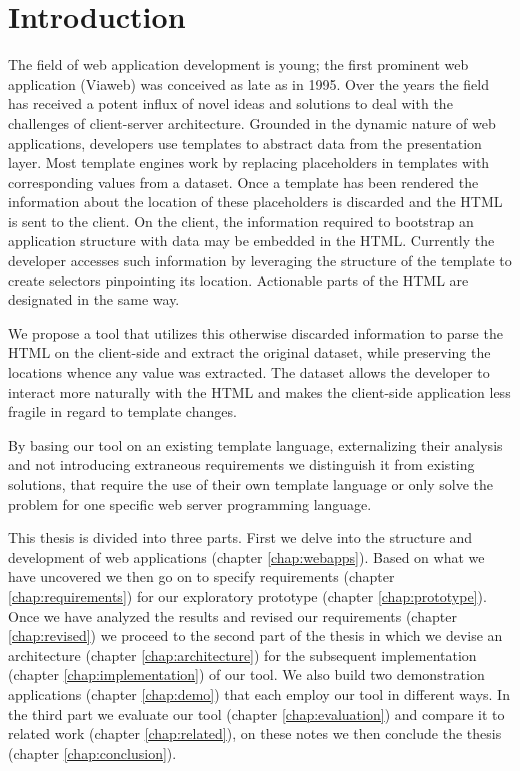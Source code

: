\documentclass[thesis.tex]{subfiles}
\begin{document}
\chapter{Introduction}
\label{chap:intro}
The field of web application development is young; the first prominent
web application (Viaweb) was conceived as late as in 1995.
Over the years the field has received a potent influx of novel ideas and
solutions to deal with the challenges of client-server architecture.
Grounded in the dynamic nature of web applications, developers use templates to
abstract data from the presentation layer.
Most template engines work by replacing placeholders in templates with
corresponding values from a dataset.
Once a template has been rendered the information about the location of these
placeholders is discarded and the HTML is sent to the client.
On the client, the information required to bootstrap an application structure
with data may be embedded in the HTML. Currently the developer accesses such
information by leveraging the structure of the template to create selectors
pinpointing its location. Actionable parts of the HTML are designated in the
same way.

We propose a tool that utilizes this otherwise discarded information to parse
the HTML on the client-side and extract the original dataset, while preserving
the locations whence any value was extracted. The dataset allows the developer
to interact more naturally with the HTML and makes the client-side application
less fragile in regard to template changes.

By basing our tool on an existing template language, externalizing their
analysis and not introducing extraneous requirements we distinguish it from
existing solutions,
that require the use of their own template language or only solve the problem
for one specific web server programming language.


This thesis is divided into three parts. First we delve into the structure
and development of web applications (chapter \ref{chap:webapps}).
Based on what we have uncovered we then go on to specify
requirements (chapter \ref{chap:requirements}) for our
exploratory prototype (chapter \ref{chap:prototype}).
Once we have analyzed the results and revised our
requirements (chapter \ref{chap:revised}) we proceed to the second part of the
thesis in which we devise an architecture (chapter \ref{chap:architecture}) for
the subsequent implementation (chapter \ref{chap:implementation}) of our tool.
We also build two demonstration applications (chapter \ref{chap:demo}) that each
employ our tool in different ways.
In the third part we evaluate our tool (chapter \ref{chap:evaluation}) and
compare it to related work (chapter \ref{chap:related}), on these notes we then
conclude the thesis (chapter \ref{chap:conclusion}).
\end{document}
